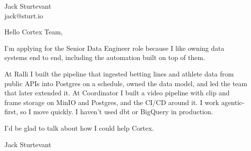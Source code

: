 \documentclass[11pt]{article}
\begin{document}
\raggedright

{\namefont\fontsize{20pt}{24pt}\selectfont Jack Sturtevant}\\[-0.3em]
jack@sturt.io

\vspace{1.2em}

Hello Cortex Team,

I'm applying for the Senior Data Engineer role because I like owning data systems end to end, including the automation built on top of them.

At Ralli I built the pipeline that ingested betting lines and athlete data from public APIs into Postgres on a schedule, owned the data model, and led the team that later extended it. At Coordinator I built a video pipeline with clip and frame storage on MinIO and Postgres, and the CI/CD around it. I work agentic-first, so I move quickly. I haven't used dbt or BigQuery in production.

I'd be glad to talk about how I could help Cortex.

\vspace{0.6em}
Jack Sturtevant
\end{document}
